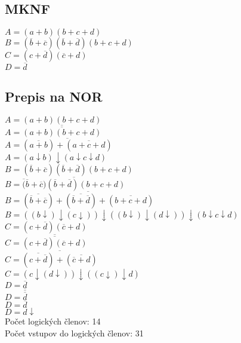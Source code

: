 \documentclass{article}
\begin{document}
\subsection{MKNF}
$A = (a+b)(b+c+d)$\\
$B = (\overline{b}+\overline{c})(\overline{b}+\overline{d})(b+c+d)$\\
$C = (c+\overline{d})(\overline{c}+d)$\\
$D = \overline{d}$

\subsection{Prepis na NOR}
$A = (a+b)(b+c+d)$\\
$A = \overline{\overline{(a+b)(b+c+d)}}$\\
$A = \overline{(\overline{a+b})+(\overline{a+c+d})}$\\
$A = (a\downarrow b)\downarrow(a\downarrow c\downarrow d)$\\
$B = (\overline{b}+\overline{c})(\overline{b}+\overline{d})(b+c+d)$\\
$B = \overline{\overline({\overline{b}+\overline{c})(\overline{b}+\overline{d})(b+c+d)}}$\\
$B = \overline{(\overline{\overline{b}+\overline{c}})+(\overline{\overline{b}+\overline{d}})+(\overline{b+c+d})}$\\
$B = ((b\downarrow)\downarrow(c\downarrow))\downarrow((b\downarrow)\downarrow(d\downarrow))\downarrow(b\downarrow c\downarrow d)$\\
$C = (c+\overline{d})(\overline{c}+d)$\\
$C = \overline{\overline{(c+\overline{d})(\overline{c}+d)}}$\\
$C = \overline{(\overline{c+\overline{d}})+(\overline{\overline{c}+d})}$\\
$C = (c\downarrow(d\downarrow))\downarrow((c\downarrow)\downarrow d)$\\
$D = \overline{d}$\\
$D = \overline{\overline{\overline{d}}}$\\
$D = \overline{d}$\\
$D = d\downarrow$\\
Počet logických členov: 14\\
Počet vstupov do logických členov: 31
\end{document}
